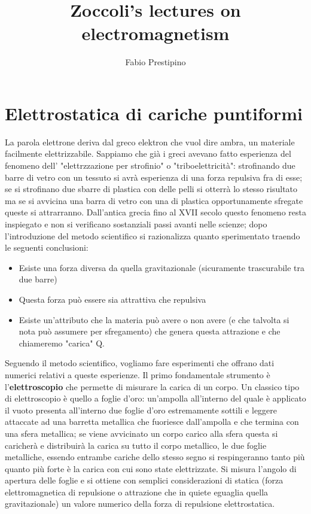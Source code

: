 \documentclass[10pt,a4paper]{article}
\author{Fabio Prestipino}
\title{Zoccoli's lectures on electromagnetism}
\begin{document}
	\maketitle
	\newpage
	\tableofcontents
	\newpage
\section{Elettrostatica di cariche puntiformi}
La parola elettrone deriva dal greco elektron che vuol dire ambra, un materiale facilmente elettrizzabile. Sappiamo che già i greci avevano fatto esperienza del fenomeno dell' "elettrzzazione per strofinio" o "triboelettricità": strofinando due barre di vetro con un tessuto si avrà esperienza di una forza repulsiva fra di esse; se si strofinano due sbarre di plastica con delle pelli si otterrà lo stesso risultato ma se si avvicina una barra di vetro con una di plastica opportunamente sfregate queste si attrarranno. Dall'antica grecia fino al XVII secolo questo fenomeno resta inspiegato e non si verificano sostanziali passi avanti nelle scienze; dopo l'introduzione del metodo scientifico si razionalizza quanto sperimentato traendo le seguenti conclusioni:
\begin{itemize}
	\item Esiste una forza diversa da quella gravitazionale (sicuramente trascurabile tra due barre)
	\item Questa forza può essere sia attrattiva che repulsiva
	\item Esiste un'attributo che la materia può avere o non avere (e che talvolta si nota può assumere per sfregamento) che genera questa attrazione e che chiameremo "carica" Q.
\end{itemize}
Seguendo il metodo scientifico, vogliamo fare esperimenti che offrano dati numerici relativi a queste esperienze. Il primo fondamentale strumento è l'\textbf{elettroscopio} che permette di misurare la carica di un corpo. Un classico tipo di elettroscopio è quello a foglie d'oro: un'ampolla all'interno del quale è applicato il vuoto presenta all'interno due foglie d'oro estremamente sottili e leggere attaccate ad una barretta metallica che fuoriesce dall'ampolla e che termina con una sfera metallica; se viene avvicinato un corpo carico alla sfera questa si caricherà e distribuirà la carica su tutto il corpo metallico, le due foglie metalliche, essendo entrambe cariche dello stesso segno si respingeranno tanto più quanto più forte è la carica con cui sono state elettrizzate. Si misura l'angolo di apertura delle foglie e si ottiene con semplici considerazioni di statica (forza elettromagnetica di repulsione o attrazione che in quiete eguaglia quella gravitazionale) un valore numerico della forza di repulsione elettrostatica. 
\end{document}
